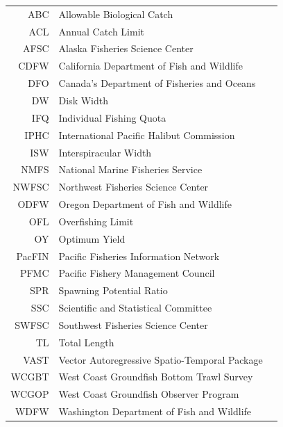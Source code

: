 \documentclass[12pt,]{article}
\begin{document}
\begin{center}
\begin{table}[ht]
\begin{tabular}{rll}
\hline
ABC & Allowable Biological Catch \\ 
  ACL & Annual Catch Limit \\ 
  AFSC & Alaska Fisheries Science Center \\ 
  CDFW & California Department of Fish and Wildlife \\ 
  DFO & Canada's Department of Fisheries and Oceans \\ 
  DW & Disk Width \\ 
  IFQ & Individual Fishing Quota \\ 
  IPHC & International Pacific Halibut Commission \\ 
  ISW & Interspiracular Width \\ 
  NMFS & National Marine Fisheries Service \\ 
  NWFSC & Northwest Fisheries Science Center \\ 
  ODFW & Oregon Department of Fish and Wildlife \\ 
  OFL & Overfishing Limit \\ 
  OY & Optimum Yield \\ 
  PacFIN & Pacific Fisheries Information Network \\ 
  PFMC & Pacific Fishery Management Council \\ 
  SPR & Spawning Potential Ratio \\ 
  SSC & Scientific and Statistical Committee \\ 
  SWFSC & Southwest Fisheries Science Center \\ 
  TL & Total Length \\ 
  VAST & Vector Autoregressive Spatio-Temporal Package \\ 
  WCGBT & West Coast Groundfish Bottom Trawl Survey \\ 
  WCGOP & West Coast Groundfish Observer Program \\ 
  WDFW & Washington Department of Fish and Wildlife \\ 
   \hline
\end{tabular}
\end{table}

\renewcommand{\arraystretch}{1}

\maketitle

\setcounter{page}{1}
\end{center}
\end{document}
